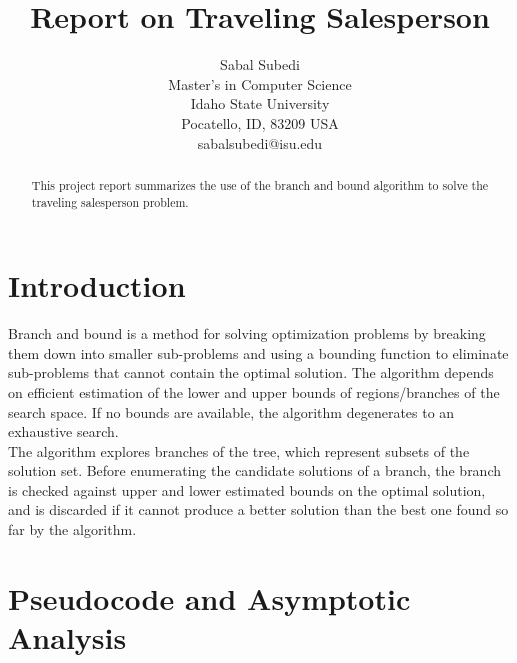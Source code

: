 \documentclass[12pt]{article}
\title{Report on Traveling Salesperson}
\author{Sabal Subedi \\
Master's in Computer Science\\
Idaho State University\\
Pocatello, ID, 83209  USA\\
sabalsubedi@isu.edu\\
}
\begin{document}
\maketitle

\begin{abstract}
This project report summarizes the use of the branch and bound algorithm to solve the traveling salesperson problem.
\end{abstract}
    
\section{Introduction}
Branch and bound is a method for solving optimization problems by breaking them down into smaller sub-problems and using a bounding function to eliminate sub-problems that cannot contain 
the optimal solution. The algorithm depends on efficient estimation of the lower and upper bounds of regions/branches of the search space. If no bounds are available, the algorithm degenerates to an exhaustive search.
\\
The algorithm explores branches of the tree, which represent subsets of the solution set. Before enumerating the candidate solutions of a branch, the branch is checked against upper and lower estimated 
bounds on the optimal solution, and is discarded if it cannot produce a better solution than the best one found so far by the algorithm.
\newpage
\section{Pseudocode and Asymptotic Analysis}
\end{document}
